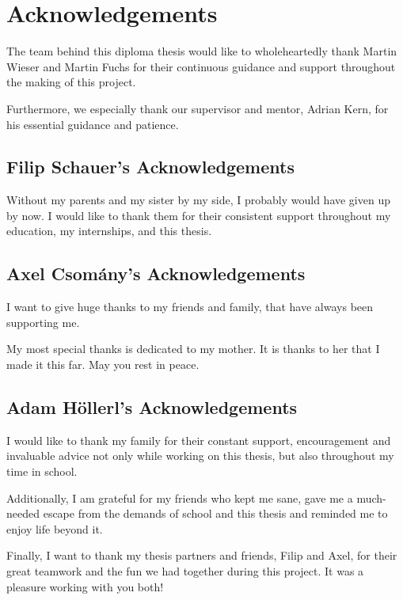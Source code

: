 
\chapter*{Acknowledgements}

The team behind this diploma thesis would like to wholeheartedly thank Martin Wieser and Martin Fuchs for their continuous guidance and support throughout the making of this project.

Furthermore, we especially thank our supervisor and mentor, Adrian Kern, for his essential guidance and patience.

\section*{Filip Schauer's Acknowledgements}

Without my parents and my sister by my side, I probably would have given up by now. I would like to thank them for their consistent support throughout my education, my internships, and this thesis. 

\section*{Axel Csomány's Acknowledgements}

I want to give huge thanks to my friends and family, that have always been supporting me.

My most special thanks is dedicated to my mother. It is thanks to her that I made it this far. May you rest in peace.

\section*{Adam Höllerl's Acknowledgements}

I would like to thank my family for their constant support, encouragement and invaluable advice not only while working on this thesis, but also throughout my time in school.

Additionally, I am grateful for my friends who kept me sane, gave me a much-needed escape from the demands of school and this thesis and reminded me to enjoy life beyond it.

Finally, I want to thank my thesis partners and friends, Filip and Axel, for their great teamwork and the fun we had together during this project. It was a pleasure working with you both!